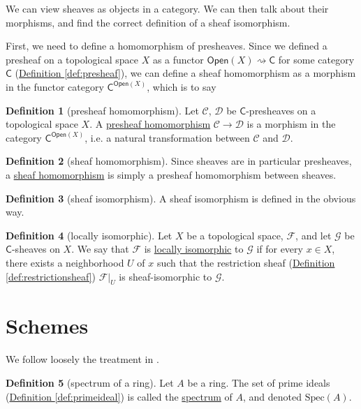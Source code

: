 \documentclass[a4paper]{report}
\newcommand{\defn}[1]{\ul{#1}}
\newcommand{\Spec}{\mathrm{Spec}}
\theoremstyle{definition}
\newtheorem{definition}{Definition}[section]
\theoremstyle{plain}
\theoremstyle{remark}
\begin{document}
We can view sheaves as objects in a category. We can then talk about their morphisms, and find the correct definition of a sheaf isomorphism. 

First, we need to define a homomorphism of presheaves. Since we defined a presheaf on a topological space $X$ as a functor $\mathsf{Open}(X) \rightsquigarrow \mathsf{C}$ for some category $\mathsf{C}$ (\hyperref[def:presheaf]{Definition \ref*{def:presheaf}}), we can define a sheaf homomorphism as a morphism in the functor category $\mathsf{C}^{\mathsf{Open}(X)}$, which is to say
\begin{definition}[presheaf homomorphism]
  \label{def:presheafhomomorphism}
  Let $\mathcal{C}$, $\mathcal{D}$ be $\mathsf{C}$-presheaves on a topological space $X$. A \defn{presheaf homomorphism} $\mathcal{C} \to \mathcal{D}$ is a morphism in the category $\mathsf{C}^{\mathsf{Open}(X)}$, i.e. a natural transformation between $\mathcal{C}$ and $\mathcal{D}$.
\end{definition}

\begin{definition}[sheaf homomorphism]
  \label{def:sheafhomomorphism}
  Since sheaves are in particular presheaves, a \defn{sheaf homomorphism} is simply a presheaf homomorphism between sheaves. 
\end{definition}
\begin{definition}[sheaf isomorphism]
  \label{def:sheafisomorphism}
  A sheaf isomorphism is defined in the obvious way.
\end{definition}
\begin{definition}[locally isomorphic]
  \label{def:locallyisomorphic}
  Let $X$ be a topological space, $\mathcal{F}$, and let $\mathcal{G}$ be $\mathsf{C}$-sheaves on $X$. We say that $\mathcal{F}$ is \defn{locally isomorphic} to $\mathcal{G}$ if for every $x \in X$, there exists a neighborhood $U$ of $x$ such that the restriction sheaf (\hyperref[def:restrictionsheaf]{Definition \ref*{def:restrictionsheaf}}) $\mathcal{F}|_{U}$ is sheaf-isomorphic to $\mathcal{G}$.
\end{definition}

\section{Schemes}
We follow loosely the treatment in \cite{vakil-rising-sea}.

\begin{definition}[spectrum of a ring]
  \label{def:spectrumofaring}
  Let $A$ be a ring. The set of prime ideals (\hyperref[def:primeideal]{Definition \ref*{def:primeideal}}) is called the \defn{spectrum} of $A$, and denoted $\Spec(A)$.
\end{definition}
\end{document}
